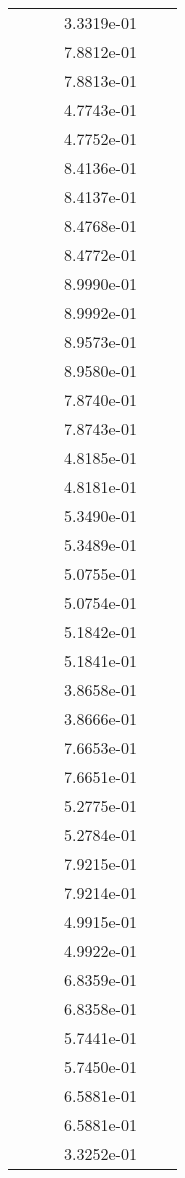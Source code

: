 \begin{xltabular}{\textwidth}{r|rS[table-format=1.3e+2]S[table-format=1.4e+2]S[table-format=1.4e+2]S[table-format=-1.5]}
&  &  & 3.3319e-01 & & \\
&  &  & 7.8812e-01 & & \\
&  &  & 7.8813e-01 & & \\
&  &  & 4.7743e-01 & & \\
&  &  & 4.7752e-01 & & \\
&  &  & 8.4136e-01 & & \\
&  &  & 8.4137e-01 & & \\
&  &  & 8.4768e-01 & & \\
&  &  & 8.4772e-01 & & \\
&  &  & 8.9990e-01 & & \\
&  &  & 8.9992e-01 & & \\
&  &  & 8.9573e-01 & & \\
&  &  & 8.9580e-01 & & \\
&  &  & 7.8740e-01 & & \\
&  &  & 7.8743e-01 & & \\
&  &  & 4.8185e-01 & & \\
&  &  & 4.8181e-01 & & \\
&  &  & 5.3490e-01 & & \\
&  &  & 5.3489e-01 & & \\
&  &  & 5.0755e-01 & & \\
&  &  & 5.0754e-01 & & \\
&  &  & 5.1842e-01 & & \\
&  &  & 5.1841e-01 & & \\
&  &  & 3.8658e-01 & & \\
&  &  & 3.8666e-01 & & \\
&  &  & 7.6653e-01 & & \\
&  &  & 7.6651e-01 & & \\
&  &  & 5.2775e-01 & & \\
&  &  & 5.2784e-01 & & \\
&  &  & 7.9215e-01 & & \\
&  &  & 7.9214e-01 & & \\
&  &  & 4.9915e-01 & & \\
&  &  & 4.9922e-01 & & \\
&  &  & 6.8359e-01 & & \\
&  &  & 6.8358e-01 & & \\
&  &  & 5.7441e-01 & & \\
&  &  & 5.7450e-01 & & \\
&  &  & 6.5881e-01 & & \\
&  &  & 6.5881e-01 & & \\
&  &  & 3.3252e-01 & & \\

\end{xltabular}

